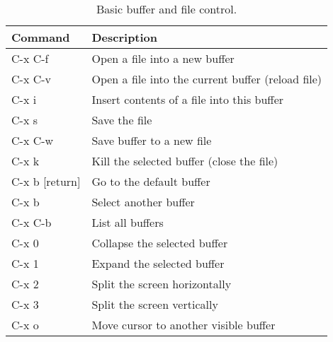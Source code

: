 \documentclass[11pt, a4paper]{article}
\begin{document}
\begin{table}[!ht]
  \caption{Basic buffer and file control.}
  \begin{center}
    \begin{tabular}{l l}
      \hline
      Command        & Description \\
      \hline
      C-x C-f        & Open a file into a new buffer \\
      C-x C-v        & Open a file into the current buffer (reload file)\\
      C-x i          & Insert contents of a file into this buffer \\
      C-x s          & Save the file \\
      C-x C-w        & Save buffer to a new file \\
      C-x k          & Kill the selected buffer (close the file) \\
      C-x b [return] & Go to the default buffer \\
      C-x b          & Select another buffer \\
      C-x C-b        & List all buffers \\
      C-x 0          & Collapse the selected buffer \\
      C-x 1          & Expand the selected buffer \\
      C-x 2          & Split the screen horizontally \\
      C-x 3          & Split the screen vertically \\
      C-x o          & Move cursor to another visible buffer \\
      \hline
    \end{tabular}
  \end{center}
\end{table}
\end{document}
